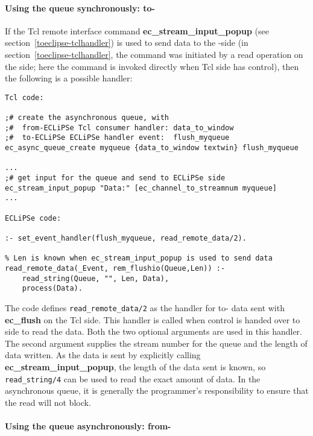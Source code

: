 \paragraph{Using the queue synchronously: to-{\eclipse}}


If the Tcl remote interface command {\bf
ec_stream_input_popup} (see section~\ref{toeclipse-tclhandler}) is used to
send data to the {\eclipse}-side (in section~\ref{toeclipse-tclhandler},
the command was initiated by a read operation on the {\eclipse} side; here
the command is invoked directly when Tcl side has control), then the
following is a possible {\eclipse} handler:

\begin{verbatim}
Tcl code:

;# create the asynchronous queue, with
;#  from-ECLiPSe Tcl consumer handler: data_to_window 
;#  to-ECLiPSe ECLiPSe handler event:  flush_myqueue
ec_async_queue_create myqueue {data_to_window textwin} flush_myqueue

...
;# get input for the queue and send to ECLiPSe side
ec_stream_input_popup "Data:" [ec_channel_to_streamnum myqueue]
...

ECLiPSe code:

:- set_event_handler(flush_myqueue, read_remote_data/2).

% Len is known when ec_stream_input_popup is used to send data
read_remote_data(_Event, rem_flushio(Queue,Len)) :-
	read_string(Queue, "", Len, Data), 
	process(Data).

\end{verbatim}

The {\eclipse} code defines \verb'read_remote_data/2' as the handler for
to-{\eclipse} data sent with {\bf ec_flush} on the Tcl side. This handler
is called when control is handed over to {\eclipse} side to read the
data. Both the two optional arguments are used in this handler. The second
argument supplies the {\eclipse} stream number for the queue and the length
of data written. As the data is
sent by explicitly calling {\bf ec_stream_input_popup}, the length of the
data sent is known, so \verb'read_string/4' can be used to read the exact amount of
data. In the asynchronous queue, it is generally the programmer's
responsibility to ensure that the read will not block.

\paragraph{Using the queue asynchronously: from-{\eclipse}}

